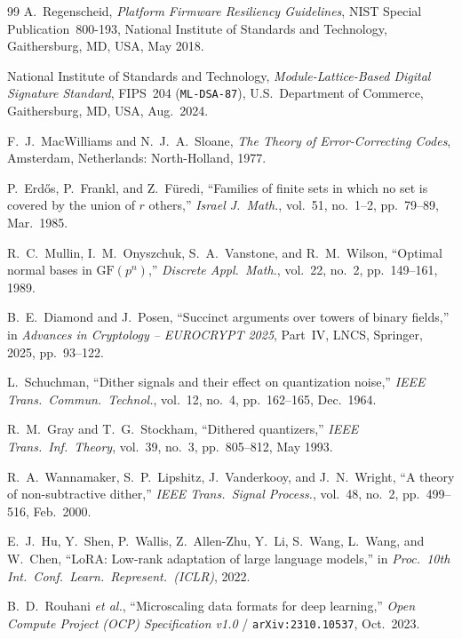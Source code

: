 \documentclass[10pt,twocolumn]{article}
\theoremstyle{spectralthm}
\begin{document}
\begin{thebibliography}{99}
A.~Regenscheid, \textit{Platform Firmware Resiliency Guidelines}, NIST Special Publication~800-193, National Institute of Standards and Technology, Gaithersburg, MD, USA, May 2018.

National Institute of Standards and Technology, \textit{Module-Lattice-Based Digital Signature Standard}, FIPS~204 (\texttt{ML-DSA-87}), U.S.\ Department of Commerce, Gaithersburg, MD, USA, Aug.\ 2024.

F.~J.~MacWilliams and N.~J.~A.~Sloane, \textit{The Theory of Error-Correcting Codes}, Amsterdam, Netherlands: North-Holland, 1977.

P.~Erd\H{o}s, P.~Frankl, and Z.~F\"{u}redi, ``Families of finite sets in which no set is covered by the union of $r$ others,'' \textit{Israel J.\ Math.}, vol.~51, no.~1--2, pp.~79--89, Mar.\ 1985.

R.~C.~Mullin, I.~M.~Onyszchuk, S.~A.~Vanstone, and R.~M.~Wilson, ``Optimal normal bases in $\mathrm{GF}(p^n)$,'' \textit{Discrete Appl.\ Math.}, vol.~22, no.~2, pp.~149--161, 1989.

B.~E.~Diamond and J.~Posen, ``Succinct arguments over towers of binary fields,'' in \textit{Advances in Cryptology -- EUROCRYPT 2025}, Part~IV, LNCS, Springer, 2025, pp.~93--122.

L.~Schuchman, ``Dither signals and their effect on quantization noise,'' \textit{IEEE Trans.\ Commun.\ Technol.}, vol.~12, no.~4, pp.~162--165, Dec.\ 1964.

R.~M.~Gray and T.~G.~Stockham, ``Dithered quantizers,'' \textit{IEEE Trans.\ Inf.\ Theory}, vol.~39, no.~3, pp.~805--812, May 1993.

R.~A.~Wannamaker, S.~P.~Lipshitz, J.~Vanderkooy, and J.~N.~Wright, ``A theory of non-subtractive dither,'' \textit{IEEE Trans.\ Signal Process.}, vol.~48, no.~2, pp.~499--516, Feb.\ 2000.

E.~J.~Hu, Y.~Shen, P.~Wallis, Z.~Allen-Zhu, Y.~Li, S.~Wang, L.~Wang, and W.~Chen, ``LoRA: Low-rank adaptation of large language models,'' in \textit{Proc.\ 10th Int.\ Conf.\ Learn.\ Represent.\ (ICLR)}, 2022.

B.~D.~Rouhani \textit{et al.}, ``Microscaling data formats for deep learning,'' \textit{Open Compute Project (OCP) Specification v1.0} / \texttt{arXiv:2310.10537}, Oct.\ 2023.


\end{thebibliography}
\end{document}
